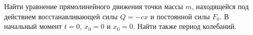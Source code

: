 Найти уравнение прямолинейного движения точки массы $m$, находящейся
под действием восстанавливающей силы $Q=-cx$ и постоянной силы $F_{0}$.
В начальный момент $t=0$, $x_{0}=0$ и $x_{0}=0$. Найти также период колебаний.
